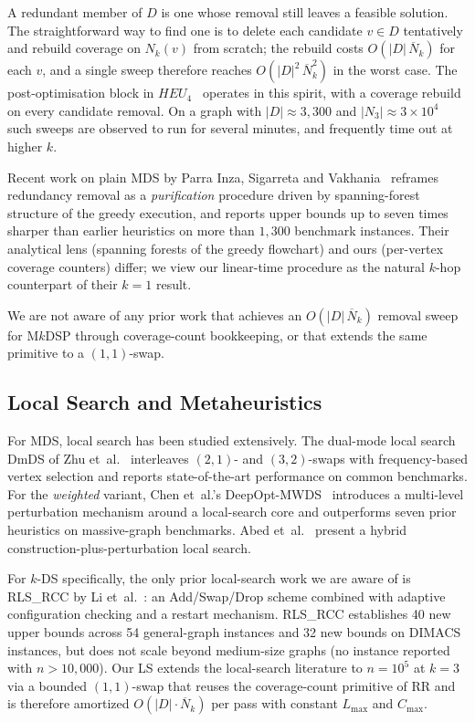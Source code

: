 \documentclass[11pt,a4paper]{article}
\newcommand{\Nk}{\overline{N}_k}
\begin{document}
A redundant member of $D$ is one whose removal still leaves a feasible
solution. The straightforward way to find one is to delete each
candidate $v\in D$ tentatively and rebuild coverage on $N_k(v)$ from
scratch; the rebuild costs $O(|D|\,\Nk)$ for each $v$, and a single
sweep therefore reaches $O(|D|^2\,\Nk^2)$ in the worst case. The
post-optimisation block in $\mathit{HEU_4}$~\cite{nguyen2020}
operates in this spirit, with a coverage rebuild on every candidate
removal. On a graph with $|D|\!\approx\!3{,}300$ and $|N_3|\!\approx\!
3\!\times\!10^4$ such sweeps are observed to run for several minutes,
and frequently time out at higher $k$.

Recent work on plain MDS by Parra Inza, Sigarreta and
Vakhania~\cite{parraInza2024MDPI} reframes redundancy removal as a
\emph{purification} procedure driven by spanning-forest structure of
the greedy execution, and reports upper bounds up to seven times
sharper than earlier heuristics on more than $1{,}300$ benchmark
instances. Their analytical lens (spanning forests of the greedy
flowchart) and ours (per-vertex coverage counters) differ; we view our
linear-time procedure as the natural $k$-hop counterpart of their
$k=1$ result.

We are not aware of any prior work that achieves an $O(|D|\,\Nk)$
removal sweep for M$k$DSP through coverage-count bookkeeping, or that
extends the same primitive to a $(1,1)$-swap.

\subsection{Local Search and Metaheuristics}
\label{sec:related:ls}

For MDS, local search has been studied extensively. The dual-mode
local search DmDS of Zhu et~al.~\cite{zhu2024} interleaves $(2,1)$-
and $(3,2)$-swaps with frequency-based vertex selection and reports
state-of-the-art performance on common benchmarks. For the
\emph{weighted} variant, Chen et~al.'s
DeepOpt-MWDS~\cite{chen2023deepopt} introduces a multi-level
perturbation mechanism around a local-search core and outperforms
seven prior heuristics on massive-graph benchmarks. Abed
et~al.~\cite{abed2022hybrid} present a hybrid construction-plus-perturbation
local search.

For $k$-DS specifically, the only prior local-search work we are aware
of is RLS\_RCC by Li et~al.~\cite{li2022restart}: an Add/Swap/Drop
scheme combined with adaptive configuration checking and a restart
mechanism. RLS\_RCC establishes 40 new upper bounds across 54
general-graph instances and 32 new bounds on DIMACS instances, but
does not scale beyond medium-size graphs (no instance reported with
$n>10{,}000$). Our LS extends the local-search literature to $n=10^5$
at $k=3$ via a bounded $(1,1)$-swap that reuses the coverage-count
primitive of RR and is therefore amortized $O(|D|\cdot\Nk)$ per pass
with constant $L_{\max}$ and $C_{\max}$.
\end{document}
